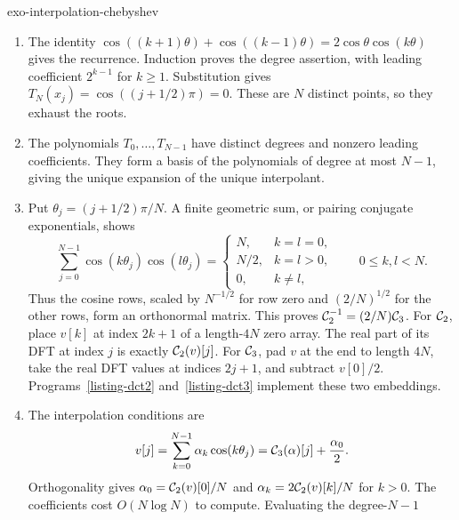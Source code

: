 \begin{correction}{exo-interpolation-chebyshev}
\begin{enumerate}
\item The identity
$\cos((k+1)\theta)+\cos((k-1)\theta)=2\cos\theta\cos(k\theta)$
gives the recurrence. Induction proves the degree assertion, with leading
coefficient $2^{k-1}$ for $k\geq1$.
Substitution gives $T_N(x_j)=\cos((j+1/2)\pi)=0$.
These are $N$ distinct points, so they exhaust the roots.
\item The polynomials $T_0,\ldots,T_{N-1}$ have distinct degrees and nonzero
leading coefficients. They form a basis of the polynomials of degree at most
$N-1$, giving the unique expansion of the unique interpolant.
\item Put $\theta_j=(j+1/2)\pi/N$. A finite geometric sum, or pairing
conjugate exponentials, shows
\[
 \sum_{j=0}^{N-1}\cos(k\theta_j)\cos(l\theta_j)
 =\begin{cases}N,&k=l=0,\\N/2,&k=l>0,\\0,&k\neq l,
 \end{cases}
 \qquad 0\leq k,l<N.
\]
Thus the cosine rows, scaled by $N^{-1/2}$ for row zero and $(2/N)^{1/2}$
for the other rows, form an orthonormal matrix. This proves
$\mathcal{C}_2^{-1}=(2/N)\mathcal{C}_3$.
For $\mathcal{C}_2$, place $v[k]$ at index $2k+1$ of a length-$4N$ zero array.
The real part of its DFT at index $j$ is exactly $\mathcal{C}_2(v)[j]$.
For $\mathcal{C}_3$, pad $v$ at the end to length $4N$, take the real DFT values
at indices $2j+1$, and subtract $v[0]/2$.
Programs~\ref{listing-dct2} and~\ref{listing-dct3} implement these two embeddings.
\begin{listing}[H]
\caption{The cosine transform $\mathcal C_2$ via a length-$4N$ FFT.}
\label{listing-dct2}
\end{listing}
\begin{listing}[H]
\caption{The cosine transform $\mathcal C_3$ via a length-$4N$ FFT.}
\label{listing-dct3}
\end{listing}
\item The interpolation conditions are
\begin{equation}
\label{eqn-calcul-coef-cheby}
 v[j]=\sum_{k=0}^{N-1}\alpha_k\cos(k\theta_j)
      =\mathcal{C}_3(\alpha)[j]+\frac{\alpha_0}{2}.
\end{equation}
Orthogonality gives
$\alpha_0=\mathcal{C}_2(v)[0]/N$ and
$\alpha_k=2\mathcal{C}_2(v)[k]/N$ for $k>0$.
The coefficients cost $O(N\log N)$ to compute. Evaluating the degree-$N-1$

\end{enumerate}
\end{correction}
